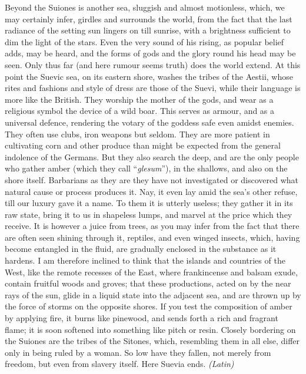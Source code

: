 
Beyond the Suiones is another sea, sluggish and almost motionless, which, we may certainly infer, girdles and surrounds the world, from the fact that the last radiance of the setting sun lingers on till sunrise, with a brightness sufficient to dim the light of the stars. Even the very sound of his rising, as popular belief adds, may be heard, and the forms of gods and the glory round his head may be seen. Only thus far (and here rumour seems truth) does the world extend. At this point the Suevic sea, on its eastern shore, washes the tribes of the Aestii, whose rites and fashions and style of dress are those of the Suevi, while their language is more like the British. They worship the mother of the gods, and wear as a religious symbol the device of a wild boar. This serves as armour, and as a universal defence, rendering the votary of the goddess safe even amidst enemies. They often use clubs, iron weapons but seldom. They are more patient in cultivating corn and other produce than might be expected from the general indolence of the Germans. But they also search the deep, and are the only people who gather amber (which they call ``\emph{glesum}''), in the shallows, and also on the shore itself. Barbarians as they are they have not investigated or discovered what natural cause or process produces it. Nay, it even lay amid the sea's other refuse, till our luxury gave it a name. To them it is utterly useless; they gather it in its raw state, bring it to us in shapeless lumps, and marvel at the price which they receive. It is however a juice from trees, as you may infer from the fact that there are often seen shining through it, reptiles, and even winged insects, which, having become entangled in the fluid, are gradually enclosed in the substance as it hardens. I am therefore inclined to think that the islands and countries of the West, like the remote recesses of the East, where frankincense and balsam exude, contain fruitful woods and groves; that these productions, acted on by the near rays of the sun, glide in a liquid state into the adjacent sea, and are thrown up by the force of storms on the opposite shores. If you test the composition of amber by applying fire, it burns like pinewood, and sends forth a rich and fragrant flame; it is soon softened into something like pitch or resin. Closely bordering on the Suiones are the tribes of the Sitones, which, resembling them in all else, differ only in being ruled by a woman. So low have they fallen, not merely from freedom, but even from slavery itself. Here Suevia ends. \emph{(Latin)}

